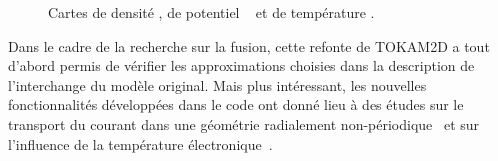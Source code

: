 \begin{refsection}
 \begin{figure}[!htbp]
    \centering
    \caption{Cartes de densité , de potentiel
    ~ et de température
    .}
    \label{2-MagColumnWithTe}
	\end{figure}

Dans le cadre de la recherche sur la fusion, cette refonte de TOKAM2D a tout
d'abord permis de vérifier les approximations choisies dans la description de
l'interchange du modèle original. Mais plus intéressant, les nouvelles
fonctionnalités développées dans le code ont donné lieu à des études sur
le transport du courant dans une géométrie radialement
non-périodique~\parencite{Futtersack} et sur l'influence de la température
électronique~\parencite{Moulton}.


\end{refsection}
